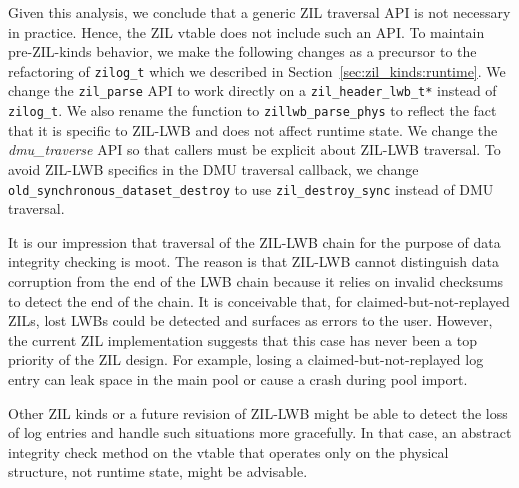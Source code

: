 \documentclass[12pt,a4paper,twoside]{book}
\begin{document}
Given this analysis, we conclude that a generic ZIL traversal API is not necessary in practice.
Hence, the ZIL vtable does not include such an API.
To maintain pre-ZIL-kinds behavior, we make the following changes as a precursor to the refactoring of \lstinline{zilog_t} which we described in Section~\ref{sec:zil_kinds:runtime}.
We change the \lstinline{zil_parse} API to work directly on a \lstinline{zil_header_lwb_t*} instead of \lstinline{zilog_t}.
We also rename the function to \lstinline{zillwb_parse_phys} to reflect the fact that it is specific to ZIL-LWB and does not affect runtime state.
We change the \textit{dmu\_traverse} API so that callers must be explicit about ZIL-LWB traversal.
To avoid ZIL-LWB specifics in the DMU traversal callback, we change \lstinline{old_synchronous_dataset_destroy} to use \lstinline{zil_destroy_sync} instead of DMU traversal.

It is our impression that traversal of the ZIL-LWB chain for the purpose of data integrity checking is moot.
The reason is that ZIL-LWB cannot distinguish data corruption from the end of the LWB chain because it relies on invalid checksums to detect the end of the chain.
It is conceivable that, for claimed-but-not-replayed ZILs, lost LWBs could be detected and surfaces as errors to the user.
However, the current ZIL implementation suggests that this case has never been a top priority of the ZIL design.
For example, losing a claimed-but-not-replayed log entry can leak space in the main pool or cause a crash during pool import.

Other ZIL kinds or a future revision of ZIL-LWB might be able to detect the loss of log entries and handle such situations more gracefully.
In that case, an abstract integrity check method on the vtable that operates only on the physical structure, not runtime state, might be advisable.
\end{document}
